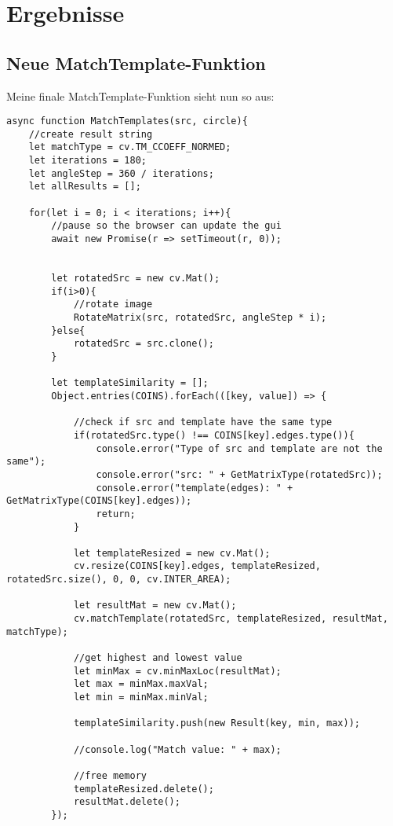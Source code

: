 \section{Ergebnisse}

\subsection{Neue MatchTemplate-Funktion}
Meine finale MatchTemplate-Funktion sieht nun so aus:

\begin{lstlisting}[style=JavaScript]
async function MatchTemplates(src, circle){
    //create result string
    let matchType = cv.TM_CCOEFF_NORMED;
    let iterations = 180;
    let angleStep = 360 / iterations;
    let allResults = [];

    for(let i = 0; i < iterations; i++){
        //pause so the browser can update the gui
        await new Promise(r => setTimeout(r, 0));


        let rotatedSrc = new cv.Mat();
        if(i>0){
            //rotate image
            RotateMatrix(src, rotatedSrc, angleStep * i);
        }else{
            rotatedSrc = src.clone();
        }

        let templateSimilarity = [];
        Object.entries(COINS).forEach(([key, value]) => {

            //check if src and template have the same type
            if(rotatedSrc.type() !== COINS[key].edges.type()){
                console.error("Type of src and template are not the same");
                console.error("src: " + GetMatrixType(rotatedSrc));
                console.error("template(edges): " + GetMatrixType(COINS[key].edges));
                return;
            }

            let templateResized = new cv.Mat();
            cv.resize(COINS[key].edges, templateResized, rotatedSrc.size(), 0, 0, cv.INTER_AREA);

            let resultMat = new cv.Mat();
            cv.matchTemplate(rotatedSrc, templateResized, resultMat, matchType);

            //get highest and lowest value
            let minMax = cv.minMaxLoc(resultMat);
            let max = minMax.maxVal;
            let min = minMax.minVal;

            templateSimilarity.push(new Result(key, min, max));

            //console.log("Match value: " + max);

            //free memory
            templateResized.delete();
            resultMat.delete();
        });


\end{lstlisting}
